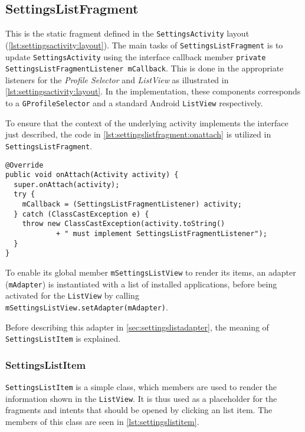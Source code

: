 \subsection{SettingsListFragment}\label{sec:settingslistfragment}
This is the static fragment defined in the \lstinline|SettingsActivity| layout (\cref{lst:settingsactivity:layout}).
The main tasks of \lstinline|SettingsListFragment| is to update \lstinline|SettingsActivity| using the interface callback member \lstinline|private SettingsListFragmentListener mCallback|.
This is done in the appropriate listeners for the \textit{Profile Selector} and \textit{ListView} as illustrated in \cref{lst:settingsactivity:layout}.
In the implementation, these components corresponds to a \lstinline|GProfileSelector| and a standard Android \lstinline|ListView| respectively.

To ensure that the context of the underlying activity implements the interface just described, the code in \cref{lst:settingslistfragment:onattach} is utilized in \lstinline|SettingsListFragment|.

\begin{lstlisting}[caption={Implementation to make sure the underlying activity implements the \lstinline|SettingsListFragmentListener| interface.}, label={lst:settingslistfragment:onattach}]
@Override
public void onAttach(Activity activity) {
  super.onAttach(activity);
  try {
    mCallback = (SettingsListFragmentListener) activity;
  } catch (ClassCastException e) {
    throw new ClassCastException(activity.toString()
            + " must implement SettingsListFragmentListener");
  }
}
\end{lstlisting}

To enable its global member \lstinline|mSettingsListView| to render its items, an adapter (\lstinline|mAdapter|) is instantiated with a list of installed applications, before being activated for the \lstinline|ListView| by calling \lstinline|mSettingsListView.setAdapter(mAdapter)|.

Before describing this adapter in \cref{sec:settingslistadapter}, the meaning of \lstinline|SettingsListItem| is explained.

\subsubsection{SettingsListItem}
\lstinline|SettingsListItem| is a simple class, which members are used to render the information shown in the \lstinline|ListView|.
It is thus used as a placeholder for the fragments and intents that should be opened by clicking an list item.
The members of this class are seen in \cref{lst:settingslistitem}.

